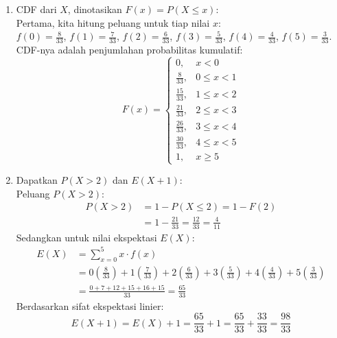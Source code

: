 \documentclass[12pt,a4paper]{article}
\begin{document}
\begin{enumerate}
\begin{enumerate}
          \item CDF dari $X$, dinotasikan $F(x) = P(X \le x)$: \\
                Pertama, kita hitung peluang untuk tiap nilai $x$: \\
                $f(0)=\frac{8}{33}$, $f(1)=\frac{7}{33}$, $f(2)=\frac{6}{33}$, $f(3)=\frac{5}{33}$, $f(4)=\frac{4}{33}$, $f(5)=\frac{3}{33}$. \\
                CDF-nya adalah penjumlahan probabilitas kumulatif:
                \[
                  F(x) = \begin{cases}
                    0,             & x < 0       \\
                    \frac{8}{33},  & 0 \le x < 1 \\
                    \frac{15}{33}, & 1 \le x < 2 \\
                    \frac{21}{33}, & 2 \le x < 3 \\
                    \frac{26}{33}, & 3 \le x < 4 \\
                    \frac{30}{33}, & 4 \le x < 5 \\
                    1,             & x \ge 5
                  \end{cases}
                \]

          \item Dapatkan $P(X>2)$ dan $E(X+1)$: \\
                Peluang $P(X>2)$:
                \begin{align*}
                  P(X>2) & = 1 - P(X \le 2) = 1 - F(2)                        \\
                         & = 1 - \frac{21}{33} = \frac{12}{33} = \frac{4}{11}
                \end{align*}
                Sedangkan untuk nilai ekspektasi $E(X)$:
                \begin{align*}
                  E(X) & = \sum_{x=0}^{5} x \cdot f(x)                                                                                                                                                 \\
                       & = 0\left(\frac{8}{33}\right) + 1\left(\frac{7}{33}\right) + 2\left(\frac{6}{33}\right) + 3\left(\frac{5}{33}\right) + 4\left(\frac{4}{33}\right) + 5\left(\frac{3}{33}\right) \\
                       & = \frac{0 + 7 + 12 + 15 + 16 + 15}{33} = \frac{65}{33}
                \end{align*}
                Berdasarkan sifat ekspektasi linier:
                \[
                  E(X+1) = E(X) + 1 = \frac{65}{33} + 1 = \frac{65}{33} + \frac{33}{33} = \frac{98}{33}
                \]
        \end{enumerate}


\end{enumerate}
\end{document}
